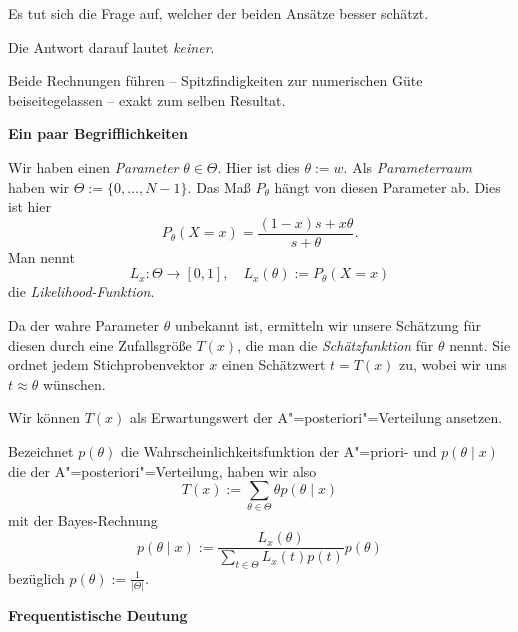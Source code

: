 \documentclass[8pt]{beamer}
\newcommand{\strong}[1]{\textsf{\textbf{#1}}}
\newcommand{\parspace}{\vspace{0.8em}}
\newcommand{\centerheadline}[1]{%
  \begin{center}\strong{#1}\end{center}}
\begin{document}
\begin{frame}
Es tut sich die Frage auf, welcher der beiden Ansätze besser schätzt.\pause

\parspace
Die Antwort darauf lautet \emph{keiner}.\pause

\parspace
Beide Rechnungen führen -- Spitzfindigkeiten zur numerischen Güte
beiseitegelassen -- exakt zum selben Resultat.
\end{frame}

\begin{frame}
\centerheadline{Ein paar Begrifflichkeiten}
\end{frame}

\begin{frame}
Wir haben einen \emph{Parameter} $\theta\in\Theta$. Hier ist dies
$\theta:=w$. Als \emph{Parameterraum} haben wir $\Theta:=\{0,\ldots,N-1\}$.
Das Maß $P_\theta$ hängt von diesen Parameter ab. Dies ist hier
\[P_\theta(X=x) = \frac{(1-x)s+x\theta}{s+\theta}.\]\pause
Man nennt
\[L_x\colon\Theta\to [0,1],\quad L_x(\theta) := P_\theta(X=x)\]
die \emph{Likelihood-Funktion}.\pause

\parspace
Da der wahre Parameter $\theta$ unbekannt ist, ermitteln wir unsere
Schätzung für diesen durch eine Zufallsgröße $T(x)$, die man die
\emph{Schätzfunktion} für $\theta$ nennt. Sie ordnet jedem
Stichprobenvektor $x$ einen Schätzwert $t=T(x)$ zu, wobei wir uns
$t\approx\theta$ wünschen.
\end{frame}

\begin{frame}
Wir können $T(x)$ als Erwartungswert der A"=posteriori"=Verteilung
ansetzen.\pause

\parspace
Bezeichnet $p(\theta)$ die
Wahrscheinlichkeitsfunktion der A"=priori- und $p(\theta\mid x)$ die der
A"=posteriori"=Verteilung, haben wir also
\[T(x) := \sum_{\theta\in\Theta}\theta p(\theta\mid x)\]
mit der Bayes-Rechnung
\[p(\theta\mid x) := \frac{L_x(\theta)}{\sum_{t\in\Theta}L_x(t)p(t)} p(\theta)\]
bezüglich $p(\theta):=\frac{1}{|\Theta|}$.
\end{frame}

\begin{frame}
\centerheadline{Frequentistische Deutung}
\end{frame}
\end{document}
